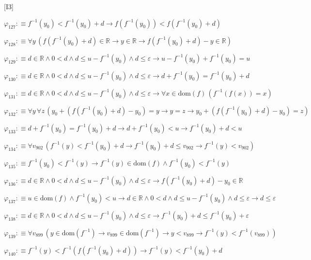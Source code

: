 \begin{fullproof}{[I3]}
\begin{abbrevlist}
\item $\varphi_{127} :\equiv f^{-1}(y_{0}) < f^{-1}(y_{0}) + d \to f(f^{-1}(y_{0})) < f(f^{-1}(y_{0}) + d)$
\item $\varphi_{128} :\equiv \forall y\,(f(f^{-1}(y_{0}) + d) \in \mathbb{R} \to y \in \mathbb{R} \to f(f^{-1}(y_{0}) + d) - y \in \mathbb{R})$
\item $\varphi_{129} :\equiv d \in \mathbb{R} \land 0 < d \land d \leq u - f^{-1}(y_{0}) \land d \leq \varepsilon \to u - f^{-1}(y_{0}) + f^{-1}(y_{0}) = u$
\item $\varphi_{130} :\equiv d \in \mathbb{R} \land 0 < d \land d \leq u - f^{-1}(y_{0}) \land d \leq \varepsilon \to d + f^{-1}(y_{0}) = f^{-1}(y_{0}) + d$
\item $\varphi_{131} :\equiv d \in \mathbb{R} \land 0 < d \land d \leq u - f^{-1}(y_{0}) \land d \leq \varepsilon \to \forall x \in \mathrm{dom}(f)\,(f^{-1}(f(x)) = x)$
\item $\varphi_{132} :\equiv \forall y\,\forall z\,(y_{0} + (f(f^{-1}(y_{0}) + d) - y_{0}) = y \to y = z \to y_{0} + (f(f^{-1}(y_{0}) + d) - y_{0}) = z)$
\item $\varphi_{133} :\equiv d + f^{-1}(y_{0}) = f^{-1}(y_{0}) + d \to d + f^{-1}(y_{0}) < u \to f^{-1}(y_{0}) + d < u$
\item $\varphi_{134} :\equiv \forall v_{902}\,(f^{-1}(y) < f^{-1}(y_{0}) + d \to f^{-1}(y_{0}) + d \leq v_{902} \to f^{-1}(y) < v_{902})$
\item $\varphi_{135} :\equiv f^{-1}(y_{0}) < f^{-1}(y) \to f^{-1}(y) \in \mathrm{dom}(f) \land f^{-1}(y_{0}) < f^{-1}(y)$
\item $\varphi_{136} :\equiv d \in \mathbb{R} \land 0 < d \land d \leq u - f^{-1}(y_{0}) \land d \leq \varepsilon \to f(f^{-1}(y_{0}) + d) - y_{0} \in \mathbb{R}$
\item $\varphi_{137} :\equiv u \in \mathrm{dom}(f) \land f^{-1}(y_{0}) < u \to d \in \mathbb{R} \land 0 < d \land d \leq u - f^{-1}(y_{0}) \land d \leq \varepsilon \to d \leq \varepsilon$
\item $\varphi_{138} :\equiv d \in \mathbb{R} \land 0 < d \land d \leq u - f^{-1}(y_{0}) \land d \leq \varepsilon \to f^{-1}(y_{0}) + d \leq f^{-1}(y_{0}) + \varepsilon$
\item $\varphi_{139} :\equiv \forall v_{899}\,(y \in \mathrm{dom}(f^{-1}) \to v_{899} \in \mathrm{dom}(f^{-1}) \to y < v_{899} \to f^{-1}(y) < f^{-1}(v_{899}))$
\item $\varphi_{140} :\equiv f^{-1}(y) < f^{-1}(f(f^{-1}(y_{0}) + d)) \to f^{-1}(y) < f^{-1}(y_{0}) + d$

\end{abbrevlist}
\end{fullproof}
